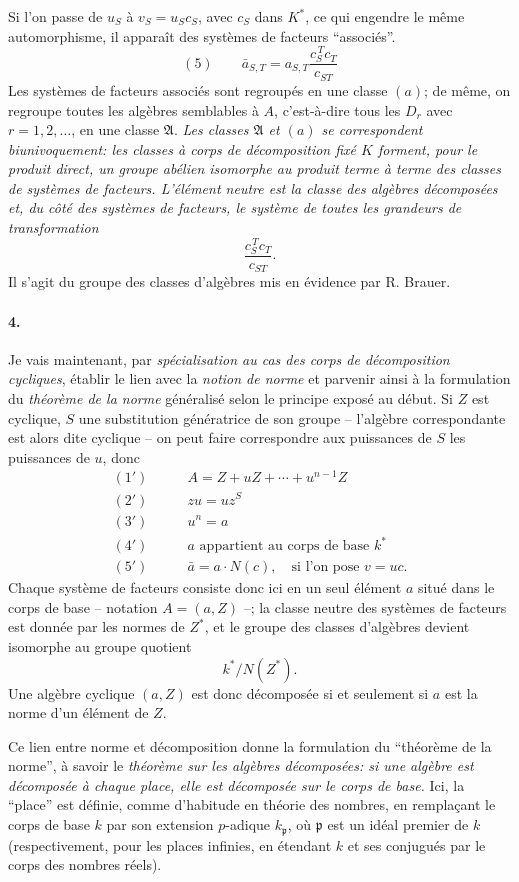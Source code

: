 Si l'on passe de \(u_S\) à \(v_S=u_Sc_S\), avec \(c_S\) dans \(K^\ast\), ce qui engendre le même automorphisme, il apparaît des systèmes de facteurs ``associés''.
\[
(5)\qquad \bar a_{S,T}=a_{S,T}\frac{c_S^{\,T}c_T}{c_{ST}}
\]
Les systèmes de facteurs associés sont regroupés en une classe \((a)\); de même, on regroupe toutes les algèbres semblables à \(A\), c'est-à-dire tous les \(D_r\) avec \(r=1,2,\ldots\), en une classe \(\mathfrak A\). \emph{Les classes \(\mathfrak A\) et \((a)\) se correspondent biunivoquement: les classes à corps de décomposition fixé \(K\) forment, pour le produit direct, un groupe abélien isomorphe au produit terme à terme des classes de systèmes de facteurs. L'élément neutre est la classe des algèbres décomposées et, du côté des systèmes de facteurs, le système de toutes les grandeurs de transformation}
\[
        \frac{c_S^{\,T}c_T}{c_{ST}}.
\]
Il s'agit du groupe des classes d'algèbres mis en évidence par R. Brauer.

\paragraph{4.}
Je vais maintenant, par \emph{spécialisation au cas des corps de décomposition cycliques}, établir le lien avec la \emph{notion de norme} et parvenir ainsi à la formulation du \emph{théorème de la norme} généralisé selon le principe exposé au début. Si \(Z\) est cyclique, \(S\) une substitution génératrice de son groupe -- l'algèbre correspondante est alors dite cyclique -- on peut faire correspondre aux puissances de \(S\) les puissances de \(u\), donc
\[
\begin{aligned}
(1')\qquad &A=Z+uZ+\cdots+u^{n-1}Z\\
(2')\qquad &zu=uz^S\\
(3')\qquad &u^n=a\\
(4')\qquad &a\text{ appartient au corps de base }k^\ast\\
(5')\qquad &\bar a=a\cdot N(c),\quad \text{si l'on pose }v=uc.
\end{aligned}
\]
Chaque système de facteurs consiste donc ici en un seul élément \(a\) situé dans le corps de base -- notation \(A=(a,Z)\) --; la classe neutre des systèmes de facteurs est donnée par les normes de \(Z^\ast\), et le groupe des classes d'algèbres devient isomorphe au groupe quotient
\[
        k^\ast/N(Z^\ast).
\]
Une algèbre cyclique \((a,Z)\) est donc décomposée si et seulement si \(a\) est la norme d'un élément de \(Z\).

Ce lien entre norme et décomposition donne la formulation du ``théorème de la norme'', à savoir le \emph{théorème sur les algèbres décomposées: si une algèbre est décomposée à chaque place, elle est décomposée sur le corps de base.} Ici, la ``place'' est définie, comme d'habitude en théorie des nombres, en remplaçant le corps de base \(k\) par son extension \(p\)-adique \(k_{\mathfrak p}\), où \(\mathfrak p\) est un idéal premier de \(k\) (respectivement, pour les places infinies, en étendant \(k\) et ses conjugués par le corps des nombres réels).


